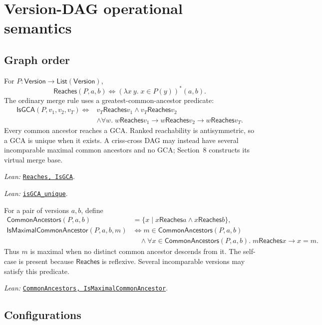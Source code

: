 \documentclass[11pt]{article}
\theoremstyle{definition}
\newcommand{\Version}{\mathsf{Version}}
\newcommand{\reach}{\mathrel{\mathsf{Reaches}}}
\newcommand{\src}[2]{\href{../../#1}{\texttt{#2}}}
\newcommand{\anchor}[2]{\par\smallskip\noindent\emph{Lean: }\src{#1}{#2}.}
\begin{document}
\section{Version-DAG operational semantics}
\label{sec:execution}

\subsection{Graph order}

For $P:\Version\to\mathsf{List}(\Version)$,
\[
 \mathsf{Reaches}(P,a,b)
 \Longleftrightarrow
 (\lambda x\ y.\;x\in P(y))^*(a,b).
\]
The ordinary merge rule uses a greatest-common-ancestor predicate:
\[
\begin{aligned}
 \mathsf{IsGCA}(P,v_1,v_2,v_T)\Longleftrightarrow{}&
 v_T\reach v_1\land v_T\reach v_2\\
 &\land\forall w.\;w\reach v_1\to w\reach v_2\to w\reach v_T.
\end{aligned}
\]
Every common ancestor reaches a GCA. Ranked reachability is antisymmetric, so
a GCA is unique when it exists. A criss-cross DAG may instead have several
incomparable maximal common ancestors and no GCA; Section~8 constructs its
virtual merge base.
\anchor{Sal/MRDTs/Framework/Execution.lean}{Reaches, IsGCA}
\anchor{Sal/MRDTs/Metatheory/StoreInvariant.lean}{isGCA\_unique}

For a pair of versions $a,b$, define
\[
\begin{aligned}
 \mathsf{CommonAncestors}(P,a,b)&=
 \{x\mid x\reach a\land x\reach b\},\\
 \mathsf{IsMaximalCommonAncestor}(P,a,b,m)&\Longleftrightarrow
 m\in\mathsf{CommonAncestors}(P,a,b)\\
 &\quad\land\forall x\in\mathsf{CommonAncestors}(P,a,b).\;
   m\reach x\to x=m.
\end{aligned}
\]
Thus $m$ is maximal when no distinct common ancestor descends from it. The
self-case is present because $\mathsf{Reaches}$ is reflexive. Several
incomparable versions may satisfy this predicate.
\anchor{Sal/MRDTs/Framework/Execution.lean}
  {CommonAncestors, IsMaximalCommonAncestor}

\subsection{Configurations}
\end{document}
